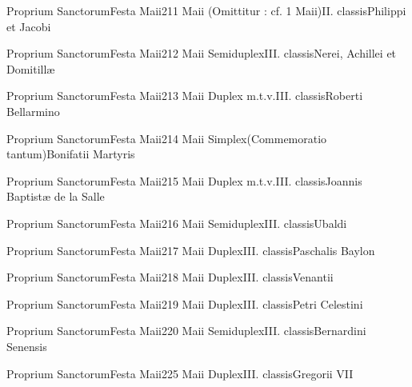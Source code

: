 \documentclass[nocturnale-romanum.tex]{subfiles}
\begin{document}
	{Proprium Sanctorum}{Festa Maii}{2}{11 Maii}
	{(Omittitur : cf. 1 Maii)}{II. classis}{Philippi et Jacobi}
	{}
	{}

	{Proprium Sanctorum}{Festa Maii}{2}{12 Maii}
	{Semiduplex}{III. classis}{Nerei, Achillei et Domitillæ}
	{}
	{}

	{Proprium Sanctorum}{Festa Maii}{2}{13 Maii}
	{Duplex m.t.v.}{III. classis}{Roberti Bellarmino}
	{}
	{}

	{Proprium Sanctorum}{Festa Maii}{2}{14 Maii}
	{Simplex}{(Commemoratio tantum)}{Bonifatii Martyris}
	{}
	{}

	{Proprium Sanctorum}{Festa Maii}{2}{15 Maii}
	{Duplex m.t.v.}{III. classis}{Joannis Baptistæ de la Salle}
	{}
	{}

	{Proprium Sanctorum}{Festa Maii}{2}{16 Maii}
	{Semiduplex}{III. classis}{Ubaldi}
	{}
	{}

	{Proprium Sanctorum}{Festa Maii}{2}{17 Maii}
	{Duplex}{III. classis}{Paschalis Baylon}
	{}
	{}


	{Proprium Sanctorum}{Festa Maii}{2}{18 Maii}
	{Duplex}{III. classis}{Venantii}
	{}
	{}

	{Proprium Sanctorum}{Festa Maii}{2}{19 Maii}
	{Duplex}{III. classis}{Petri Celestini}
	{}
	{}

	{Proprium Sanctorum}{Festa Maii}{2}{20 Maii}
	{Semiduplex}{III. classis}{Bernardini Senensis}
	{}
	{}

	{Proprium Sanctorum}{Festa Maii}{2}{25 Maii}
	{Duplex}{III. classis}{Gregorii VII}
	{}
	{}
\end{document}
